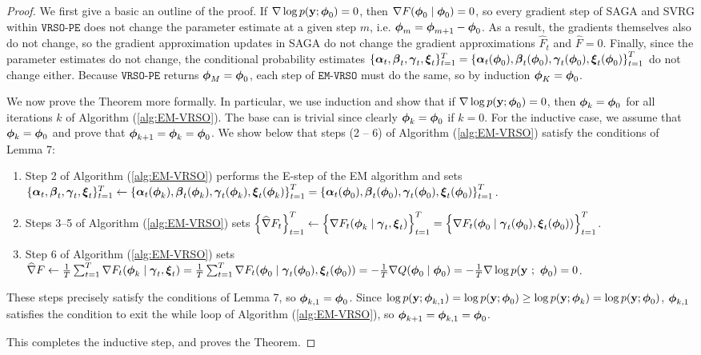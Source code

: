 \begin{proof}

We first give a basic an outline of the proof. If $\nabla \log p(\mathbf{y};\boldsymbol{\phi}_0) = 0$, then $\nabla F(\boldsymbol{\phi}_0 \mid \boldsymbol{\phi}_0) = 0$, so every gradient step of SAGA and SVRG within $\texttt{VRSO-PE}$ does not change the parameter estimate at a given step $m$, i.e. $\boldsymbol{\phi}_m = \boldsymbol{\phi}_{m+1} - \boldsymbol{\phi}_0$. As a result, the gradients themselves also do not change, so the gradient approximation updates in SAGA do not change the gradient approximations $\widehat F_t$ and $\widehat F = 0$. Finally, since the parameter estimates do not change, the conditional probability estimates $\{\boldsymbol{\alpha}_t, \boldsymbol{\beta}_t, \boldsymbol{\gamma}_t, \boldsymbol{\xi}_t\}_{t=1}^T = \left\{\boldsymbol{\alpha}_t(\boldsymbol{\phi}_0), \boldsymbol{\beta}_t(\boldsymbol{\phi}_0), \boldsymbol{\gamma}_t(\boldsymbol{\phi}_0), \boldsymbol{\xi}_t(\boldsymbol{\phi}_0) \right\}_{t=1}^T$ do not change either. Because $\texttt{VRSO-PE}$ returns $\boldsymbol{\phi}_M = \boldsymbol{\phi}_0$, each step of $\texttt{EM-VRSO}$ must do the same, so by induction $\boldsymbol{\phi}_K = \boldsymbol{\phi}_0$.

We now prove the Theorem more formally. In particular, we use induction and show that if $\nabla \log p(\mathbf{y};\boldsymbol{\phi}_0) = 0$, then $\boldsymbol{\phi}_{k} = \boldsymbol{\phi}_0$ for all iterations $k$ of Algorithm (\ref{alg:EM-VRSO}). The base can is trivial since clearly $\boldsymbol{\phi}_{k} = \boldsymbol{\phi}_0$ if $k=0$. For the inductive case, we assume that $\boldsymbol{\phi}_k = \boldsymbol{\phi}_0$ and prove that $\boldsymbol{\phi}_{k+1} = \boldsymbol{\phi}_k = \boldsymbol{\phi}_0$. We show below that steps (2 -- 6) of Algorithm (\ref{alg:EM-VRSO}) satisfy the conditions of Lemma 7:
%
\begin{enumerate}
    \item Step 2 of Algorithm (\ref{alg:EM-VRSO}) performs the E-step of the EM algorithm and sets $\{\boldsymbol{\alpha}_t, \boldsymbol{\beta}_t, \boldsymbol{\gamma}_t, \boldsymbol{\xi}_t\}_{t=1}^T \gets \left\{\boldsymbol{\alpha}_t(\boldsymbol{\phi}_k), \boldsymbol{\beta}_t(\boldsymbol{\phi}_k), \boldsymbol{\gamma}_t(\boldsymbol{\phi}_k), \boldsymbol{\xi}_t(\boldsymbol{\phi}_k) \right\}_{t=1}^T = \left\{\boldsymbol{\alpha}_t(\boldsymbol{\phi}_0), \boldsymbol{\beta}_t(\boldsymbol{\phi}_0), \boldsymbol{\gamma}_t(\boldsymbol{\phi}_0), \boldsymbol{\xi}_t(\boldsymbol{\phi}_0) \right\}_{t=1}^T$.
    \item Steps 3--5 of Algorithm (\ref{alg:EM-VRSO}) sets $\left\{\widehat \nabla F_t\right\}_{t=1}^T \gets \Big\{\nabla F_t(\boldsymbol{\phi}_k \mid \boldsymbol{\gamma}_t, \boldsymbol{\xi}_t) \Big\}_{t=1}^T = \Big\{\nabla F_t(\boldsymbol{\phi}_0 \mid \boldsymbol{\gamma}_t(\boldsymbol{\phi}_0), \boldsymbol{\xi}_t(\boldsymbol{\phi}_0)) \Big\}_{t=1}^T$.
    \item Step 6 of Algorithm (\ref{alg:EM-VRSO}) sets $\widehat \nabla F \gets \frac{1}{T} \sum_{t=1}^T \nabla F_t(\boldsymbol{\phi}_k \mid \boldsymbol{\gamma}_t, \boldsymbol{\xi}_t) = \frac{1}{T} \sum_{t=1}^T \nabla F_t(\boldsymbol{\phi}_0 \mid \boldsymbol{\gamma}_t(\boldsymbol{\phi}_0), \boldsymbol{\xi}_t(\boldsymbol{\phi}_0)) = -\frac{1}{T} \nabla Q(\boldsymbol{\phi}_0 \mid \boldsymbol{\phi}_0) = -\frac{1}{T} \nabla \log p(\mathbf{y} ~;~ \boldsymbol{\phi}_0) = 0$.
\end{enumerate}
%
These steps precisely satisfy the conditions of Lemma 7, so $\boldsymbol{\phi}_{k,1} = \boldsymbol{\phi}_{0}$. Since $\log p(\mathbf{y}; \boldsymbol{\phi}_{k,1}) = \log p(\mathbf{y}; \boldsymbol{\phi}_{0}) \geq \log p(\mathbf{y};\boldsymbol{\phi}_{k}) = \log p(\mathbf{y}; \boldsymbol{\phi}_{0})$, $\boldsymbol{\phi}_{k,1}$ satisfies the condition to exit the while loop of Algorithm (\ref{alg:EM-VRSO}), so $\boldsymbol{\phi}_{k+1} = \boldsymbol{\phi}_{k,1} = \boldsymbol{\phi}_{0}$. 

This completes the inductive step, and proves the Theorem.
\end{proof}

